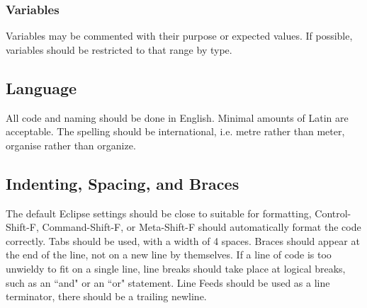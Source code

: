 \documentclass[]{report}
\begin{document}
\subsubsection{Variables}
Variables may be commented with their purpose or expected values.
If possible, variables should be restricted to that range by type.

\subsection{Language}
All code and naming should be done in English.
Minimal amounts of Latin are acceptable.
The spelling should be international, i.e. metre rather than meter, organise rather than organize.

\subsection{Indenting, Spacing, and Braces}
The default Eclipse settings should be close to suitable for formatting, Control-Shift-F, Command-Shift-F, or Meta-Shift-F should automatically format the code correctly.
Tabs should be used, with a width of 4 spaces.
Braces should appear at the end of the line, not on a new line by themselves.
If a line of code is too unwieldy to fit on a single line, line breaks should take place at logical breaks, such as an ``and" or an ``or" statement.
Line Feeds should be used as a line terminator, there should be a trailing newline.
\end{document}
